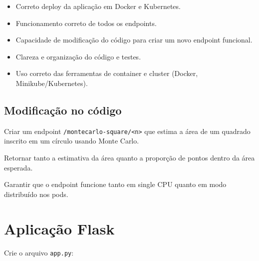 \documentclass[a4paper,12pt]{article}
\begin{document}
\begin{itemize}
    \item Correto deploy da aplicação em Docker e Kubernetes.
    \item Funcionamento correto de todos os endpoints.
    \item Capacidade de modificação do código para criar um novo endpoint funcional.
    \item Clareza e organização do código e testes.
    \item Uso correto das ferramentas de container e cluster (Docker, Minikube/Kubernetes).
\end{itemize}

\subsection*{Modificação no código}

Criar um endpoint \texttt{/montecarlo-square/<n>} que estima a área de um quadrado inscrito em um círculo usando Monte Carlo.

Retornar tanto a estimativa da área quanto a proporção de pontos dentro da área esperada.

Garantir que o endpoint funcione tanto em single CPU quanto em modo distribuído nos pods.



\section{Aplicação Flask}

Crie o arquivo \texttt{app.py}:
\end{document}
